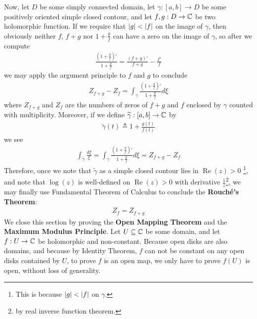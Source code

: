 \documentclass{report}
\begin{document}
Now, let $D$ be some simply connected domain,  let $\gamma :[a,b]\rightarrow D$ be some positively oriented simple closed contour, and let $f,g:D\rightarrow \mathbb{C}$ be two holomorphic function. If we require that $\left|g\right|<\left|f\right|$ on the image of $\gamma $, then obviously neither $f$, $f+g$ nor $1+\frac{g}{f}$ can have a zero on the image of $\gamma $, so after we compute 
\begin{align*}
\frac{(1+\frac{g}{f})'}{1+ \frac{g}{f}}=\frac{(f+g)'}{f+g}- \frac{f'}{f} 
\end{align*}
we may apply the argument principle to $f$ and  $g$ to conclude 
\begin{align*}
Z_{f+g}-Z_f= \int_{\gamma } \frac{(1+\frac{g}{f})'}{1+\frac{g}{f}}d\xi
\end{align*}
where $Z_{f+g}$ and $Z_f$ are the numbers of zeros of  $f+g$ and  $f$ enclosed by $\gamma $ counted with multiplicity. Moreover, if we define $\widetilde{\gamma }:[a,b]\rightarrow \mathbb{C} $ by 
\begin{align*}
\tilde{\gamma }(t)\triangleq  1 + \frac{g(t)}{f(t)} 
\end{align*}
we see 
\begin{align*}
\int_{\tilde{\gamma }} \frac{d\xi}{\xi}= \int_{\gamma } \frac{(1+ \frac{g}{f})'}{1+\frac{g}{f}}d\xi = Z_{f+g}-Z_f 
\end{align*}
Therefore, once we note  that $\tilde{\gamma }$ as a simple closed contour lies in $\operatorname{Re}(z)>0$ \footnote{This is because  $\left|g\right|<\left|f\right|$ on $\gamma $.}, and note that $\log(z)$ is well-defined on $\operatorname{Re}(z)>0$ with derivative $\frac{1}{z}$\footnote{by real inverse function theorem.}, we may finally use Fundamental Theorem of Calculus to conclude the \textbf{Rouché's Theorem}: 
\begin{align*}
Z_f=Z_{f+g}
\end{align*}
We close this section by proving the \textbf{Open Mapping Theorem} and the \textbf{Maximum Modulus Principle}. Let $U\subseteq \mathbb{C}$ be some domain, and let $f:U\rightarrow \mathbb{C}$ be holomorphic and non-constant. Because open disks are also domains, and because by Identity Theorem, $f$ can not be constant on any open disks contained by $U$, to prove $f$ is an open map, we only have to prove $f(U)$ is open, without loss of generality.\\
\end{document}
